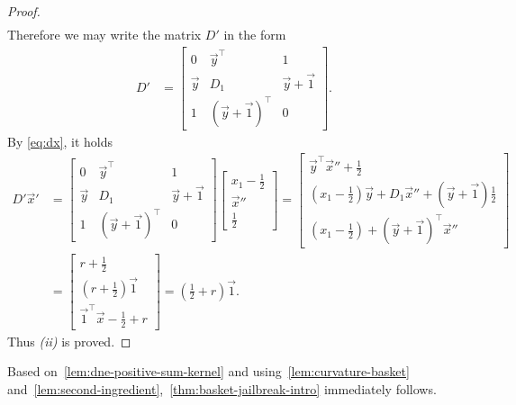 \documentclass[11pt,a4paper]{article}
\newcommand{\distmatrix}{D}
\newcommand{\x}{\vec{x}}
\newcommand{\y}{\vec{y}}
\newcommand{\one}{\vec{1}}
\begin{document}
\begin{proof}
\begin{align*}
            \end{align*}
        Therefore we may write the matrix $\distmatrix'$ in the form
            \begin{align*}
                \distmatrix' &= \begin{bmatrix}
                    0 & \y^\top & 1\\
                    \y  & \distmatrix_1 & \y +\one\\
                    1 & (\y  +\one)^\top & 0
                \end{bmatrix}.
            \end{align*}
        By \cref{eq:dx}, it holds
            \begin{align*}
                \distmatrix'\x' &= \begin{bmatrix}
                    0 & \y^\top & 1\\
                    \y  & \distmatrix_1 & \y +\one\\
                    1 & (\y  +\one)^\top & 0
                \end{bmatrix}\begin{bmatrix}
                    x_1 - \tfrac{1}{2}\\
                    {\x}'' \\
                    \tfrac{1}{2}
                \end{bmatrix} = \begin{bmatrix}
                    \y^\top \x'' + \tfrac{1}{2}\\
                    (x_1-\tfrac{1}{2}) \y  + \distmatrix_1\x'' + (\y +\one)\tfrac{1}{2}\\
                    (x_1-\tfrac{1}{2}) + (\y +\one)^\top \x''
                \end{bmatrix}\\
                &= \begin{bmatrix}
                    r + \tfrac{1}{2}\\
                    (r+\tfrac{1}{2})\one\\
                    \one^\top \x  - \frac{1}{2} + r
                \end{bmatrix} = (\tfrac{1}{2}+r)\one.
            \end{align*}
        Thus \emph{(ii)} is proved.
    \end{proof}

    Based on~\cref{lem:dne-positive-sum-kernel} and using~\cref{lem:curvature-basket} and~\cref{lem:second-ingredient},~\cref{thm:basket-jailbreak-intro} immediately follows.
    
\end{document}
